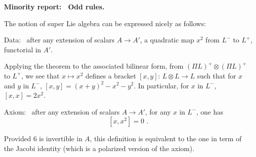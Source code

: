 \bigskip\noindent
{\bf Minority report: \ Odd rules.}

The notion of super Lie algebra can be expressed nicely
as follows:

\noindent
Data: \ after any extension of scalars $A\to A'$, a
quadratic map $x^2$ from $L^-$ to $L^{\plus}$,
functorial in $A'$.

Applying the theorem to the associated bilinear form,
from $(\Pi L)^{\plus}\otimes(\Pi L)^{\plus}$ to
$L^{\plus}$, we see that $x\mapsto x^2$ defines a
bracket $[x,y]\colon\, L\otimes L\to L$ such that for
$x$ and $y$ in $L^-$, $[x,y]=(x+y)^2-x^2-y^2$.
In particular, for $x$ in $L^-$, $[x,x]=2x^2$.

\noindent
Axiom: \ 
after any extension of scalars $A\to A'$, for any $x$ in
$L^-$, one has
$$
[x,x^2]=0\,\,.
$$

Provided $6$ is invertible in $A$, this definition is
equivalent to the one in term of the Jacobi identity
(which is a polarized version of the axiom).

\enddocument





